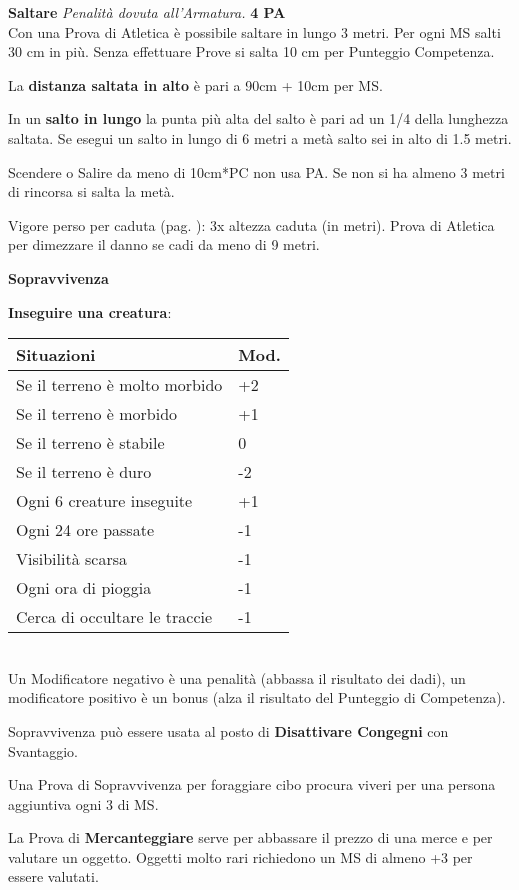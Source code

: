 \documentclass[12pt,a4paper,twoside,openany]{book}
\begin{document}
\begin{multicols}{2}
\medskip

\textbf{Saltare} \textit{Penalità dovuta all'Armatura.} \textbf{4 PA}\\

Con una Prova di Atletica è possibile saltare in lungo 3 metri. Per ogni MS salti 30 cm in più. Senza effettuare Prove si salta 10 cm per Punteggio Competenza.

La \textbf{distanza saltata in alto} è pari a 90cm + 10cm per MS.

In un \textbf{salto in lungo} la punta più alta del salto è pari ad un 1/4 della lunghezza saltata. Se esegui un salto in lungo di 6 metri a metà salto sei in alto di 1.5 metri.

Scendere o Salire da meno di 10cm*PC non usa PA. Se non si ha almeno 3 metri di rincorsa si salta la metà.

Vigore perso per caduta (pag. \pageref{cadute}): 3x altezza caduta (in metri). Prova di Atletica per dimezzare il danno se cadi da meno di 9 metri.

\medskip

\textbf{Sopravvivenza}

\smallskip

\textbf{Inseguire una creatura}:

\begin{tabular}{ll}
	Situazioni & Mod.\\
	\toprule
	Se il terreno è molto morbido& +2\\
	Se il terreno è morbido& +1\\
	Se il terreno è stabile& 0\\
	Se il terreno è duro& -2\\
	Ogni 6 creature inseguite& +1\\
	Ogni 24 ore passate & -1\\
	Visibilità scarsa&-1\\
	Ogni ora di pioggia&-1 \\
	Cerca di occultare le traccie& -1\\
\end{tabular}\\

Un Modificatore negativo è una penalità (abbassa il risultato dei dadi), un modificatore positivo è un bonus (alza il risultato del Punteggio di Competenza).

Sopravvivenza può essere usata al posto di \textbf{Disattivare Congegni} con Svantaggio.

Una Prova di Sopravvivenza per foraggiare cibo procura viveri per una persona aggiuntiva ogni 3 di MS.

\medskip

La Prova di \textbf{Mercanteggiare} serve per abbassare il prezzo di una merce e per valutare un oggetto. Oggetti molto rari richiedono un MS di almeno +3 per essere valutati.

\end{multicols}
\end{document}
